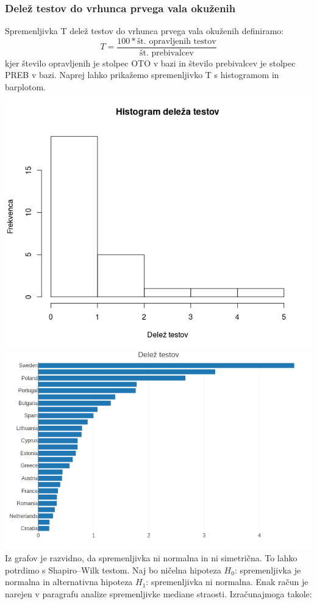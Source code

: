 \documentclass[a4paper,11pt]{article}
\begin{document}
\subsubsection{Delež testov do vrhunca prvega vala okuženih}
Spremenljivka T delež testov do vrhunca prvega vala okuženih definiramo:
\[T = \frac{100 * \text{št. opravljenih testov}}{\text{št. prebivalcev}}\]
kjer število opravljenih je stolpec OTO v bazi in število prebivalcev je stolpec PREB v bazi. Naprej lahko prikažemo spremenljivko T s histogramom in barplotom.
\includegraphics[scale=0.6]{histogram_delez_testov}
\includegraphics[scale=0.6]{barplot_delez_testov}
Iz grafov je razvidno, da spremenljivka ni normalna in ni simetrična. To lahko potrdimo s Shapiro–Wilk testom. Naj bo ničelna hipoteza \(H_0\): spremenljivka je normalna in alternativna hipoteza \(H_1\): spremenljivka ni normalna. Enak račun je narejen v paragrafu analize spremenljivke mediane straosti. Izračunajmoga takole:
\end{document}
